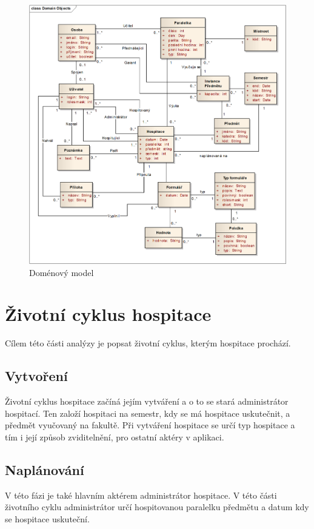 \begin{figure}[p]
\begin{center}
\includegraphics[width=16cm]{figures/DomainModel}
\caption{Doménový model}
\label{fig:domainmodel}
\end{center}
\end{figure}

\section{Životní cyklus hospitace}
Cílem této části analýzy je popsat životní cyklus, kterým hospitace prochází. 

\subsection{Vytvoření}
Životní cyklus hospitace začíná jejím vytváření a o to se stará administrátor hospitací. Ten založí hospitaci na semestr, kdy se má hospitace uskutečnit, a předmět vyučovaný na fakultě. Při vytváření hospitace se určí typ hospitace a tím i její způsob zviditelnění, pro ostatní aktéry v aplikaci.

\subsection{Naplánování}
V této fázi je také hlavním aktérem administrátor hospitace. V této části životního cyklu administrátor určí hospitovanou paralelku předmětu a datum  kdy se hospitace uskuteční.  

